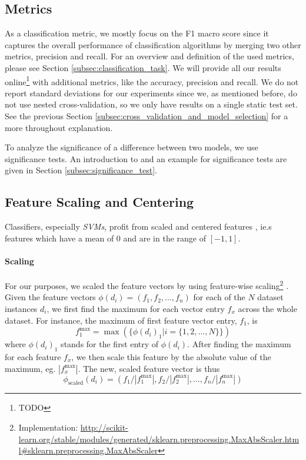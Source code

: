 \subsection{Metrics}
As a classification metric, we mostly focus on the F1 macro score since it captures the overall performance of classification algorithms by merging two other metrics, precision and recall.
For an overview and definition of the used metrics, please see Section \ref{subsec:classification_task}.
We will provide all our results online\footnote{TODO} with additional metrics, like the accuracy, precision and recall.
We do not report standard deviations for our experiments since we, as mentioned before, do not use nested cross-validation, so we only have results on a single static test set.
See the previous Section \ref{subsec:cross_validation_and_model_selection} for a more throughout explanation.

To analyze the significance of a difference between two models, we use significance tests.
An introduction to and an example for significance tests are given in Section \ref{subsec:significance_test}.

\subsection{Feature Scaling and Centering}
Classifiers, especially \textit{SVMs}, profit from scaled and centered features \cite{Graf2001}, ie.s features which have a mean of 0 and are in the range of $[-1, 1]$.

\paragraph{Scaling}
For our purposes, we scaled the feature vectors by using feature-wise scaling\footnote{Implementation: \url{http://scikit-learn.org/stable/modules/generated/sklearn.preprocessing.MaxAbsScaler.html\#sklearn.preprocessing.MaxAbsScaler}} \cite[p.~567]{Bishop2006}.
Given the feature vectors $\phi(d_i) = (f_1, f_2, \ldots, f_n)$ for each of the $N$ dataset instances $d_i$, we first find the maximum for each vector entry $f_x$ across the whole dataset. For instance, the maximum of first feature vector entry, $f_1$, is
\begin{equation*}
f_1^{\textrm{max}} = \max(\{\phi(d_i)_{1} | i = \{1, 2, \ldots, N\} \})
\end{equation*}
where $\phi(d_i)_{1}$ stands for the first entry of $\phi(d_i)$.
After finding the maximum for each feature $f_x$, we then scale this feature by the absolute value of the maximum, eg. $|f_x^{\textrm{max}}|$.
The new, scaled feature vector is thus
\begin{equation*}
\phi_{\textrm{scaled}}(d_i) = (f_1 / |f_1^{\textrm{max}}|, f_2 / |f_2^{\textrm{max}}|, \ldots, f_n / |f_n^{\textrm{max}}|)
\end{equation*}


